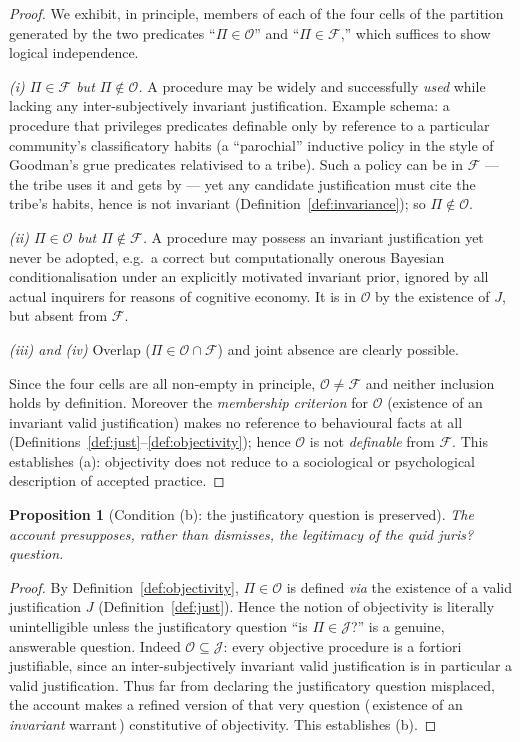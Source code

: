 \documentclass{amsart}
\theoremstyle{definition}
\theoremstyle{plain}
\newtheorem{proposition}{Proposition}
\begin{document}
\begin{proof}
We exhibit, in principle, members of each of the four cells of the partition
generated by the two predicates ``$\Pi \in \mathcal{O}$'' and ``$\Pi \in
\mathcal{F}$,'' which suffices to show logical independence.

\emph{(i) $\Pi \in \mathcal{F}$ but $\Pi \notin \mathcal{O}$.} A procedure may
be widely and successfully \emph{used} while lacking any inter-subjectively
invariant justification. Example schema: a procedure that privileges
predicates definable only by reference to a particular community's
classificatory habits (a ``parochial'' inductive policy in the style of
Goodman's grue predicates relativised to a tribe). Such a policy can be in
$\mathcal{F}$ --- the tribe uses it and gets by --- yet any candidate
justification must cite the tribe's habits, hence is not invariant
(Definition~\ref{def:invariance}); so $\Pi \notin \mathcal{O}$.

\emph{(ii) $\Pi \in \mathcal{O}$ but $\Pi \notin \mathcal{F}$.} A procedure may
possess an invariant justification yet never be adopted, e.g.\ a correct but
computationally onerous Bayesian conditionalisation under an explicitly
motivated invariant prior, ignored by all actual inquirers for reasons of
cognitive economy. It is in $\mathcal{O}$ by the existence of $J$, but absent
from $\mathcal{F}$.

\emph{(iii) and (iv)} Overlap ($\Pi \in \mathcal{O}\cap\mathcal{F}$) and joint
absence are clearly possible.

Since the four cells are all non-empty in principle, $\mathcal{O} \neq
\mathcal{F}$ and neither inclusion holds by definition. Moreover the
\emph{membership criterion} for $\mathcal{O}$ (existence of an invariant valid
justification) makes no reference to behavioural facts at all
(Definitions~\ref{def:just}--\ref{def:objectivity}); hence $\mathcal{O}$ is not
\emph{definable} from $\mathcal{F}$. This establishes (a): objectivity does not
reduce to a sociological or psychological description of accepted practice.
\end{proof}

\begin{proposition}[Condition (b): the justificatory question is preserved]
\label{prop:b}
The account presupposes, rather than dismisses, the legitimacy of the quid
juris? question.
\end{proposition}

\begin{proof}
By Definition~\ref{def:objectivity}, $\Pi \in \mathcal{O}$ is defined
\emph{via} the existence of a valid justification $J$
(Definition~\ref{def:just}). Hence the notion of objectivity is literally
unintelligible unless the justificatory question ``is $\Pi \in \mathcal{J}$?''
is a genuine, answerable question. Indeed $\mathcal{O} \subseteq \mathcal{J}$:
every objective procedure is a fortiori justifiable, since an
inter-subjectively invariant valid justification is in particular a valid
justification. Thus far from declaring the justificatory question misplaced,
the account makes a refined version of that very question
($\,$existence of an \emph{invariant} warrant$\,$) constitutive of
objectivity. This establishes (b).
\end{proof}
\end{document}
